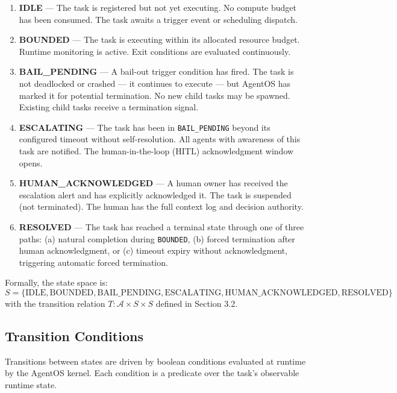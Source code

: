 \begin{enumerate}
\item \textbf{IDLE} — The task is registered but not yet executing. No compute budget has been consumed. The task awaits a trigger event or scheduling dispatch.

\item \textbf{BOUNDED} — The task is executing within its allocated resource budget. Runtime monitoring is active. Exit conditions are evaluated continuously.

\item \textbf{BAIL\_PENDING} — A bail-out trigger condition has fired. The task is not deadlocked or crashed — it continues to execute — but AgentOS has marked it for potential termination. No new child tasks may be spawned. Existing child tasks receive a termination signal.

\item \textbf{ESCALATING} — The task has been in \texttt{BAIL\_PENDING} beyond its configured timeout without self-resolution. All agents with awareness of this task are notified. The human-in-the-loop (HITL) acknowledgment window opens.

\item \textbf{HUMAN\_ACKNOWLEDGED} — A human owner has received the escalation alert and has explicitly acknowledged it. The task is suspended (not terminated). The human has the full context log and decision authority.

\item \textbf{RESOLVED} — The task has reached a terminal state through one of three paths: (a) natural completion during \texttt{BOUNDED}, (b) forced termination after human acknowledgment, or (c) timeout expiry without acknowledgment, triggering automatic forced termination.
\end{enumerate}

Formally, the state space is:
\[
S = \{\text{IDLE}, \text{BOUNDED}, \text{BAIL\_PENDING}, \text{ESCALATING}, \text{HUMAN\_ACKNOWLEDGED}, \text{RESOLVED}\}
\]
with the transition relation $T: \mathcal{A} \times S \times S$ defined in Section 3.2.

\subsection{Transition Conditions}

Transitions between states are driven by boolean conditions evaluated at runtime by the AgentOS kernel. Each condition is a predicate over the task's observable runtime state.

